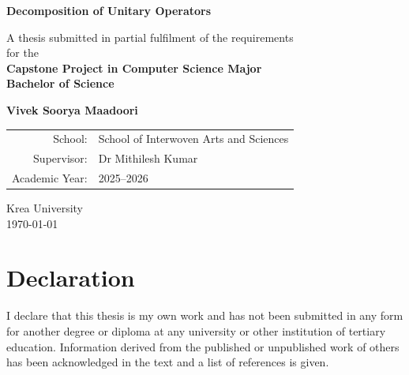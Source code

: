 \documentclass[12pt, a4paper, oneside]{report}
\theoremstyle{plain}
\theoremstyle{definition}
\theoremstyle{remark}
\begin{document}


\begin{titlepage}
\thispagestyle{empty}
\begin{center}

\vspace*{1.5cm}

{\LARGE\bfseries Decomposition of Unitary Operators}\\[0.8em]

\vspace{2.5cm}

{\large A thesis submitted in partial fulfilment of the requirements\\
for the\\[0.5em]
\textbf{Capstone Project in Computer Science Major}\\[0.4em]
\textbf{Bachelor of Science}}

\vspace{2.5cm}

{\large\bfseries Vivek Soorya Maadoori}

\vspace{2cm}

\begin{tabular}{rl}
School: & School of Interwoven Arts and Sciences \\[0.3em]
Supervisor: & Dr Mithilesh Kumar \\[0.3em]
Academic Year: & 2025--2026 \\
\end{tabular}

\vfill

{\normalsize
Krea University\\[1em]
\today
}

\end{center}
\end{titlepage}

\clearpage
\thispagestyle{plain}
\chapter*{Declaration}

I declare that this thesis is my own work and has not been submitted in any form for another
degree or diploma at any university or other institution of tertiary education. Information
derived from the published or unpublished work of others has been acknowledged in the text
and a list of references is given.
\end{document}
